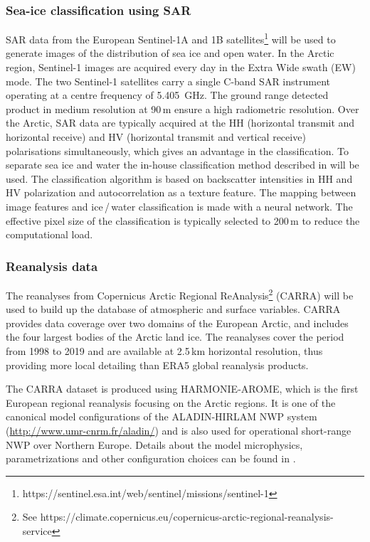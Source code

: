 \documentclass[12pt,oneside,a4paper]{article}
\begin{document}
\subsubsection{Sea-ice classification using SAR}
%
\label{sec:sar}
SAR data from the European Sentinel-1A and 1B
satellites\footnote{https://sentinel.esa.int/web/sentinel/missions/sentinel-1}
will be used to generate images of the distribution of sea ice and open water.
In the Arctic region, Sentinel-1 images are acquired every day in the Extra
Wide swath (EW) mode. The two Sentinel-1 satellites carry a single C-band SAR
instrument operating at a centre frequency of 5.405\, GHz. The ground range
detected product in medium resolution at 90\,m ensure a high radiometric
resolution. Over the Arctic, SAR data are typically acquired at the HH
(horizontal transmit and horizontal receive) and HV (horizontal transmit and
vertical receive) polarisations simultaneously, which gives an advantage in the
classification. To separate sea ice and water the in-house classification
method described in \citet{aldenhoff:compa:18} will be used. The classification
algorithm is based on backscatter intensities in HH and HV polarization and
autocorrelation as a texture feature. The mapping between image features and
ice\,/\,water classification is made with a neural network. The effective pixel
size of the classification is typically selected to 200\,m to reduce the
computational load.

\subsubsection{Reanalysis data}
%
\label{sec:harmonie}
The reanalyses from Copernicus Arctic Regional ReAnalysis\footnote{See https://climate.copernicus.eu/copernicus-arctic-regional-reanalysis-service} (CARRA) will be used to build up the database of atmospheric and surface variables. CARRA provides data coverage over two domains of the European Arctic, and includes the four largest bodies of the Arctic land ice. The reanalyses cover the period from 1998 to 2019 and are available at 2.5\,km horizontal resolution, thus providing more local detailing than ERA5 global reanalysis products. 

The CARRA dataset is produced using HARMONIE-AROME, which is the first European regional reanalysis focusing on the Arctic regions. It is one of
the canonical model configurations of the ALADIN-HIRLAM NWP system
(\url{http://www.umr-cnrm.fr/aladin/}) and is also used for operational
short-range NWP over Northern Europe. Details about the model
microphysics, parametrizations and other configuration choices can be found in
\citet{bengtsson:2017:harmo}. 
\end{document}
